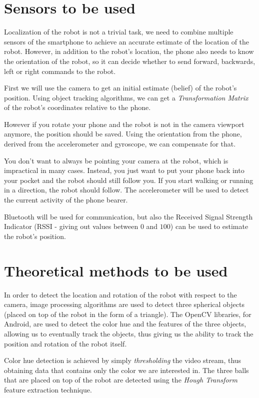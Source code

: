 \documentclass[a4paper,10pt]{article}
\begin{document}
\section{Sensors to be used}

Localization of the robot is not a trivial task, we need to combine
multiple sensors of the smartphone to achieve an accurate estimate of the
location of the robot. However, in addition to the robot's location, the phone also needs to know the orientation of the robot, so it can decide whether to send forward, backwards, left or right commands to the robot.

First we will use the camera to get an initial estimate (belief) of the robot's position. Using object tracking algorithms, we can get a \emph{Transformation Matrix} of the robot's coordinates relative to the phone.

However if you rotate your phone and the robot is not in the camera viewport anymore, the position should be saved. Using the orientation from the phone, derived from the accelerometer and gyroscope, we can compensate for that.

You don't want to always be pointing your camera at the robot, which is impractical in many cases. Instead, you just want to put your phone back into your pocket and the robot should still follow you. If you start walking or running in a direction, the robot should follow. The accelerometer will be used to detect the current activity of the phone bearer.

Bluetooth will be used for communication, but also the Received Signal Strength Indicator (RSSI - giving out values between $0$ and $100$) can be used to estimate the robot's position.

\section{Theoretical methods to be used}

In order to detect the location and rotation of the robot with respect to the camera, image processing algorithms are used to detect three spherical objects (placed on top of the robot in the form of a triangle). The OpenCV libraries, for Android, are used to detect the color hue and the features of the three objects, allowing us to eventually track the objects, thus giving us the ability to track the position and rotation of the robot itself. 

Color hue detection is achieved by simply \emph{thresholding} the video stream, thus obtaining data that contains only the color we are interested in. The three balls that are placed on top of the robot are detected using the \emph{Hough Transform} feature extraction technique.
\end{document}
